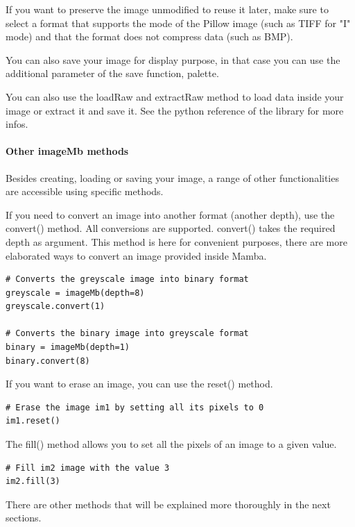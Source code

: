 \documentclass[a4paper,10pt,oneside]{article}
\begin{document}
If you want to preserve the image unmodified to reuse it later, make sure to
select a format that supports the mode of the Pillow image (such as TIFF for
"I" mode) and that the format does not compress data (such as BMP).

You can also save your image for display purpose, in that case you can use the
additional parameter of the save function, palette.

You can also use the loadRaw and extractRaw method to load data inside your
image or extract it and save it. See the python reference of the library for
more infos.

\paragraph{Other imageMb methods}

Besides creating, loading or saving your image, a range of other functionalities
are accessible using specific methods.

If you need to convert an image into another format (another depth), use the 
convert() method. All conversions are supported. convert() takes the required
depth as argument. This method is here for convenient purposes, there are more
elaborated ways to convert an image provided inside Mamba.

\lstset{language=Python}
\begin{lstlisting}
# Converts the greyscale image into binary format
greyscale = imageMb(depth=8)
greyscale.convert(1)

# Converts the binary image into greyscale format
binary = imageMb(depth=1)
binary.convert(8)
\end{lstlisting}

If you want to erase an image, you can use the reset() method. 

\lstset{language=Python}
\begin{lstlisting}
# Erase the image im1 by setting all its pixels to 0
im1.reset()
\end{lstlisting}

The fill() method allows you to set all the pixels of an image to a given value.

\lstset{language=Python}
\begin{lstlisting}
# Fill im2 image with the value 3
im2.fill(3)
\end{lstlisting}

There are other methods that will be explained more thoroughly in the next sections.
\end{document}
